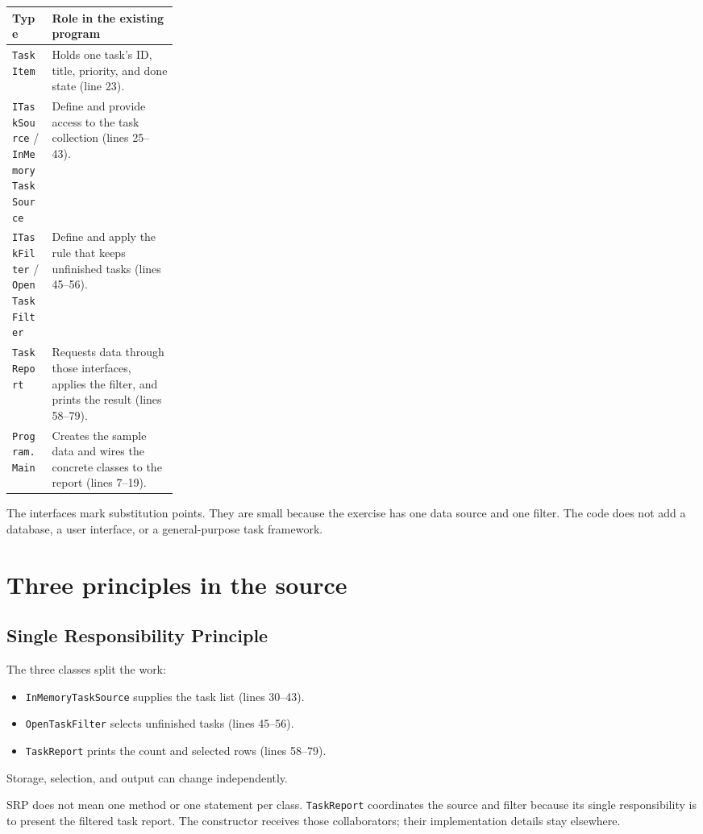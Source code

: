 \documentclass{utmreport}
\begin{document}
\begin{center}
\begin{tabularx}{0.94\linewidth}{p{0.24\linewidth}X}
\toprule
\textbf{Type} & \textbf{Role in the existing program} \\
\midrule
\texttt{TaskItem} & Holds one task's ID, title, priority, and done state (line 23). \\
\texttt{ITaskSource} / \texttt{InMemoryTaskSource} & Define and provide access to the task collection (lines 25--43). \\
\texttt{ITaskFilter} / \texttt{OpenTaskFilter} & Define and apply the rule that keeps unfinished tasks (lines 45--56). \\
\texttt{TaskReport} & Requests data through those interfaces, applies the filter, and prints the result (lines 58--79). \\
\texttt{Program.Main} & Creates the sample data and wires the concrete classes to the report (lines 7--19). \\
\bottomrule
\end{tabularx}
\end{center}

The interfaces mark substitution points. They are small because the exercise has one data source and one filter. The code does not add a database, a user interface, or a general-purpose task framework.

\chapter{Three principles in the source}
\section{Single Responsibility Principle}
The three classes split the work:
\begin{itemize}
\item \texttt{InMemoryTaskSource} supplies the task list (lines 30--43).
\item \texttt{OpenTaskFilter} selects unfinished tasks (lines 45--56).
\item \texttt{TaskReport} prints the count and selected rows (lines 58--79).
\end{itemize}
Storage, selection, and output can change independently.

SRP does not mean one method or one statement per class. \texttt{TaskReport} coordinates the source and filter because its single responsibility is to present the filtered task report. The constructor receives those collaborators; their implementation details stay elsewhere.
\end{document}
